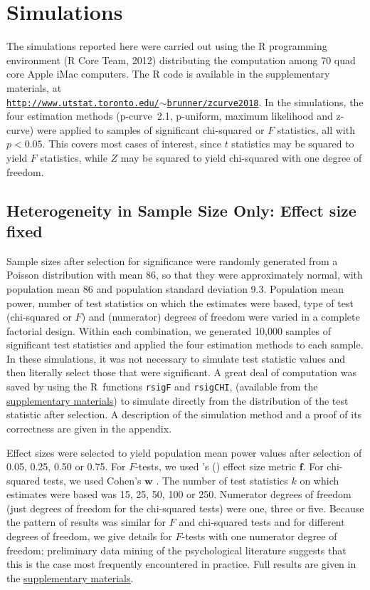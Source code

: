 \documentclass[jou]{apa6} %
\begin{document}
\section{Simulations} \label{SIMS}
The simulations reported here were carried out using the R programming environment (R Core Team, 2012) distributing the computation among 70 quad core Apple iMac computers. The R code is available in the supplementary materials, at \\
{\small
\href{http://www.utstat.toronto.edu/~brunner/zcurve2018}
     {\texttt{http://www.utstat.toronto.edu/$\sim$brunner/zcurve2018}}. 
} %
In the simulations, the four estimation methods (p-curve~2.1, p-uniform, maximum likelihood and z-curve) were applied to samples of significant chi-squared or $F$ statistics, all with $p < 0.05$. This covers most cases of interest, since $t$ statistics may be squared to yield $F$ statistics, while $Z$ may be squared to yield chi-squared with one degree of freedom. 

\subsection{Heterogeneity in Sample Size Only: Effect size fixed} \label{HETERON}
Sample sizes after selection for significance were randomly generated from a Poisson distribution with mean 86, so that they were approximately normal, with population mean 86 and population standard deviation 9.3. Population mean power, number of test statistics on which the estimates were based, type of test (chi-squared or $F$) and (numerator) degrees of freedom were varied in a complete factorial design. Within each combination, we generated 10,000 samples of significant test statistics and applied the four estimation methods to each sample. In these simulations, it was not necessary to simulate test statistic values and then literally select those that were significant. A great deal of computation was saved by using the R~functions \texttt{rsigF} and \texttt{rsigCHI}, (available from the \href{http://www.utstat.toronto.edu/~brunner/zcurve2018} {supplementary materials}) to simulate directly from the distribution of the test statistic after selection. A description of the simulation method and a  proof of its correctness are given in the appendix.

Effect sizes were selected to yield population mean power values after selection of 0.05, 0.25, 0.50 or 0.75. For $F$-tests, we used \citeauthor{Cohen1988}'s (\citeyear[][p.~275]{Cohen1988}) effect size metric $\mathbf{f}$. For chi-squared tests, we used Cohen's $\mathbf{w}$ \parencite[][p.~216]{Cohen1988}. The number of test statistics $k$ on which estimates were based was 15, 25, 50, 100 or 250. Numerator degrees of freedom (just degrees of freedom for the chi-squared tests) were one, three or five. Because the pattern of results was similar for $F$ and chi-squared tests and for different degrees of freedom, we give details for $F$-tests with one numerator degree of freedom; preliminary data mining of the psychological literature suggests that this is the case most frequently encountered in practice. Full results are given in the \href{http://www.utstat.toronto.edu/~brunner/zcurve2018} {supplementary materials}.
\end{document}
